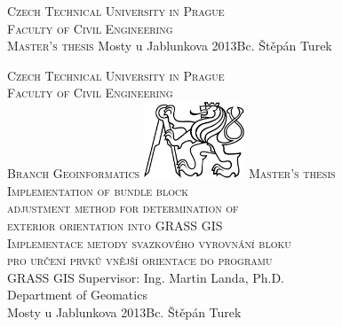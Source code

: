 \begin{center}



\newcommand{\napisCVUT}{Czech Technical University in Prague}
\newcommand{\napisFS}{Faculty of Civil Engineering}
\newcommand{\napisObor}{Branch Geoinformatics}
\newcommand{\napisKatedra}{Department of Geomatics}
\newcommand{\napisVedouci}{Ing. Martin Landa, Ph.D.}
\newcommand{\napisAutor}{Bc. Štěpán Turek}
\newcommand{\napisDatum}{Mosty u Jablunkova 2013}
\newcommand{\napisNazevI}{Implementation of bundle block}
\newcommand{\napisNazevII}{ adjustment method for determination of}
\newcommand{\napisNazevIII}{exterior orientation into GRASS GIS}
\newcommand{\napisNazevAjI}{Implementace metody svazkového vyrovnání bloku}
\newcommand{\napisNazevAjII}{pro určení prvků vnější orientace do programu}
\newcommand{\napisNazevAjIII}{GRASS GIS}
\newcommand{\napisBakalarka}{Master’s thesis}
\newcommand{\napisPraha}{Mosty u Jablunkova 2013}


%
\newcommand{\velka}[1]{\textsc{#1}}
%
% 
\newif\ifpatitul
\patitultrue

\ifpatitul
{\Large\velka{\napisCVUT}}\\
\velka{\Large\napisFS}\\
\vfill
{\LARGE\velka{\napisBakalarka}}
\vfill
{\large\napisPraha\hfill\napisAutor}
\newpage
\fi%



{\Large\velka{\napisCVUT}}\\
{\Large\velka{\napisFS}}\\
{\Large\velka{\napisObor}}
\vfill
\includegraphics[width=3cm]{logo_cvut_cb} %
\vfill
{\Large\velka{\napisBakalarka}}\\
{\Large\velka{\napisNazevI\\
\napisNazevII\\
\napisNazevIII}}\\
{\large\velka{\napisNazevAjI\\
\napisNazevAjII\\
\napisNazevAjIII}}
\vfill
{\large%
Supervisor: \napisVedouci\\
\napisKatedra\\
\bigskip
\napisDatum\hfill\napisAutor}
\end{center}
